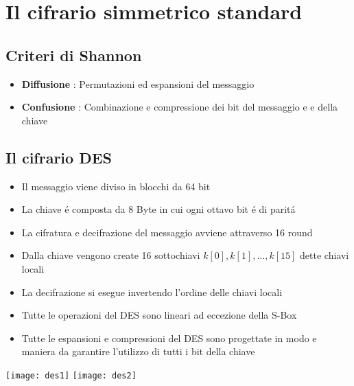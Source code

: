 \chapter{Il cifrario simmetrico standard}

\section{Criteri di Shannon}

\begin{itemize}
    \item \textbf{Diffusione} : Permutazioni ed espansioni del messaggio
    \item \textbf{Confusione} : Combinazione e compressione dei bit del messaggio e e della chiave
\end{itemize}

\section{Il cifrario DES}

\begin{itemize}
    \item Il messaggio viene diviso in blocchi da 64 bit
    \item La chiave \'e composta da 8 Byte in cui ogni ottavo bit \'e di parit\'a
    \item La cifratura e decifrazione del messaggio avviene attraverso 16 round
    \item Dalla chiave vengono create 16 sottochiavi $k[0],k[1],\dots,k[15]$ dette chiavi locali
    \item La decifrazione si esegue invertendo l'ordine delle chiavi locali
    \item Tutte le operazioni del DES sono lineari ad eccezione della S-Box
    \item Tutte le espansioni e compressioni del DES sono progettate in modo e maniera da garantire l'utilizzo di tutti i bit della chiave
\end{itemize}

\texttt{[image: des1]}
\texttt{[image: des2]}

